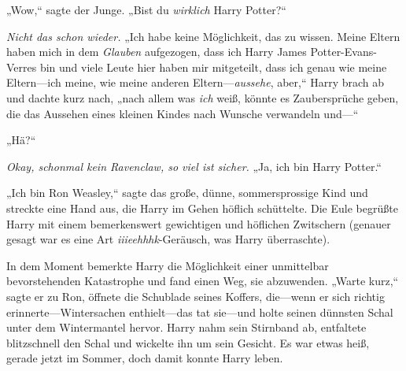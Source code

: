 „Wow,“ sagte der Junge. „Bist du \emph{wirklich} Harry Potter?“

\emph{Nicht das schon wieder.} „Ich habe keine Möglichkeit, das zu wissen. Meine Eltern haben mich in dem \emph{Glauben} aufgezogen, dass ich Harry James Potter-Evans-Verres bin und viele Leute hier haben mir mitgeteilt, dass ich genau wie meine Eltern—ich meine, wie meine anderen Eltern—\emph{aussehe}, aber,“ Harry brach ab und dachte kurz nach, „nach allem was \emph{ich} weiß, könnte es Zaubersprüche geben, die das Aussehen eines kleinen Kindes nach Wunsche verwandeln und—“

„Hä?“

\emph{Okay, schonmal kein Ravenclaw, so viel ist sicher.} „Ja, ich bin Harry Potter.“

„Ich bin Ron Weasley,“ sagte das große, dünne, sommersprossige Kind und streckte eine Hand aus, die Harry im Gehen höflich schüttelte. Die Eule begrüßte Harry mit einem bemerkenswert gewichtigen und höflichen Zwitschern (genauer gesagt war es eine Art \emph{iiieehhhk}-Geräusch, was Harry überraschte).

In dem Moment bemerkte Harry die Möglichkeit einer unmittelbar bevorstehenden Katastrophe und fand einen Weg, sie abzuwenden. „Warte kurz,“ sagte er zu Ron, öffnete die Schublade seines Koffers, die—wenn er sich richtig erinnerte—Wintersachen enthielt—das tat sie—und holte seinen dünnsten Schal unter dem Wintermantel hervor. Harry nahm sein Stirnband ab, entfaltete blitzschnell den Schal und wickelte ihn um sein Gesicht. Es war etwas heiß, gerade jetzt im Sommer, doch damit konnte Harry leben.


